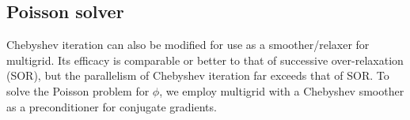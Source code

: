\subsection{Poisson solver}

Chebyshev iteration can also be modified for use as a smoother/relaxer for
multigrid. Its efficacy is comparable or better to that of successive
over-relaxation (SOR), but the parallelism of Chebyshev iteration far exceeds
that of SOR. To solve the Poisson problem for $\phi$, we employ multigrid with
a Chebyshev smoother as a preconditioner for conjugate gradients.

